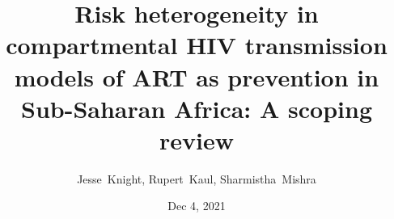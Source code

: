 \title{Risk heterogeneity in compartmental HIV transmission models of
  ART as prevention in Sub-Saharan Africa: A scoping review}
\author{Jesse~Knight, Rupert~Kaul, Sharmistha~Mishra}
\date{Dec 4, 2021}
